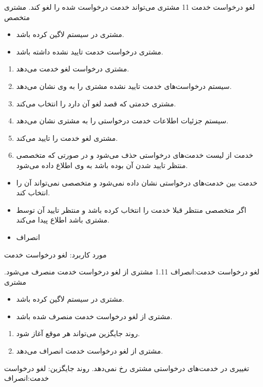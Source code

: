 \usecase
{
	لغو درخواست خدمت
}
{11}
{
	مشتری می‌تواند خدمت درخواست شده را لغو کند.
}
{
مشتری
}
{
	متخصص
}
{
	\begin{itemize}
		\vspace*{-0.6cm}
\item 
مشتری در سیستم لاگین کرده باشد.
\item 
مشتری درخواست خدمت تایید نشده داشته باشد.
	\end{itemize}
}
{
	\vspace*{-0.6cm}
	\begin{enumerate}
\item 
مشتری درخواست لغو خدمت می‌دهد.
\item
سیستم درخواست‌های خدمت تایید نشده مشتری را به وی نشان می‌دهد. 
\item
مشتری خدمتی که قصد لغو آن دارد را انتخاب می‌کند.
\item
سیستم جزئیات اطلاعات خدمت درخواستی را به مشتری نشان می‌دهد.
\item
مشتری لغو خدمت را تایید می‌کند.
\item
خدمت از لیست خدمت‌های درخواستی حذف می‌شود و در صورتی که متخصصی منتظر تایید شدن آن بوده باشد به وی اطلاع داده می‌شود.
	\end{enumerate}
}
{
		\begin{itemize}
		\vspace*{-0.6cm}
		\item 
خدمت بین خدمت‌های درخواستی نشان داده نمی‌شود و متخصصی نمی‌تواند آن را انتخاب کند.
		\item 
اگر متخصصی منتظر قبلا خدمت را انتخاب کرده باشد و منتظر تایید آن توسط مشتری باشد اطلاع پیدا می‌کند.
	\end{itemize}

}
{
			\begin{itemize}
		\vspace*{-0.6cm}
		\item
انصراف
\end{itemize}
}
{
	مورد کاربرد: لغو درخواست خدمت
}




\alternativeflow
{
	لغو درخواست خدمت:انصراف
}
{1.11}
{
	مشتری از لغو درخواست خدمت منصرف می‌شود.
}
{
	مشتری
}
{}
{
	\begin{itemize}
		\vspace*{-0.6cm}
		\item 
		مشتری در سیستم لاگین کرده باشد.
		\item
		مشتری از لغو درخواست خدمت منصرف شده باشد.
	\end{itemize}
}
{
	\vspace*{-0.6cm}
	\begin{enumerate}
		\item 
		روند جایگزین می‌تواند هر موقع آغاز شود.
		\item
		مشتری از لغو درخواست خدمت انصراف می‌دهد.
	\end{enumerate}
}
{
تغییری در خدمت‌های درخواستی مشتری رخ نمی‌دهد.
}
{
	روند جایگزین: لغو درخواست خدمت:انصراف
}

